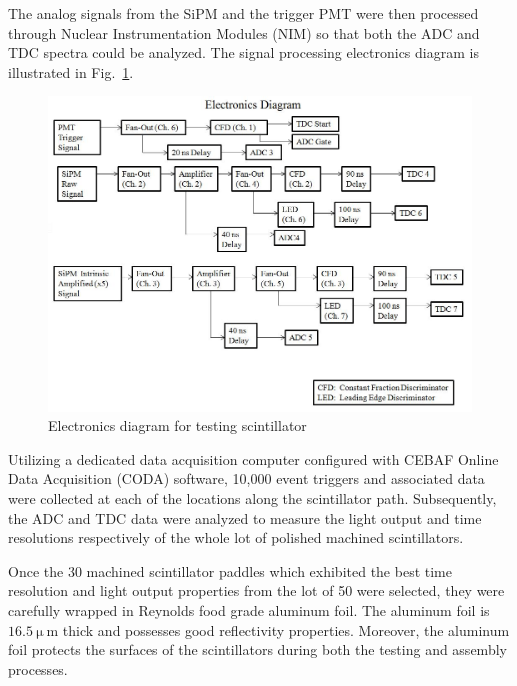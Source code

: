 The analog signals from the SiPM and the trigger PMT were then processed through Nuclear Instrumentation Modules (NIM) so that both the ADC and TDC spectra could be analyzed.  The signal processing electronics diagram is illustrated in Fig.~\ref{fig:nimelectronicsdiagram}.
\begin{figure}[!htb]
	\centering
	\includegraphics[width=1.0\columnwidth]{fabrication/figs/nim_electronics_diagram}
	\caption[Electronics diagram for testing scintillator]{Electronics diagram for testing scintillator}
	\label{fig:nimelectronicsdiagram}
\end{figure}

Utilizing a dedicated data acquisition computer configured with CEBAF Online Data Acquisition (CODA) software, 10,000 event triggers and associated data were collected at each of the locations along the scintillator path.  Subsequently, the ADC and TDC data were analyzed to measure the light output and time resolutions respectively of the whole lot of polished machined scintillators.  

Once the 30 machined scintillator paddles which exhibited the best time resolution and light output properties from the lot of 50 were selected, they were carefully wrapped in Reynolds food grade aluminum foil.  The aluminum foil is $\mathrm{16.5~\mu~m}$ thick and possesses good reflectivity properties.  Moreover, the aluminum foil protects the surfaces of the scintillators during both the testing and assembly processes.
  
